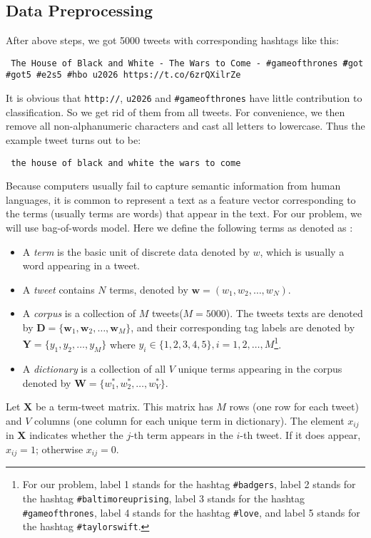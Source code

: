 \documentclass[letterpaper,11pt,twocolumn]{article}
\def\bfw{\mathbf w}
\def\bfW{\mathbf W}
\def\bfD{\mathbf D}
\def\bfY{\mathbf Y}
\def\bfX{\mathbf X}
\begin{document}
\subsection{Data Preprocessing}
After above steps, we got 5000 tweets with corresponding hashtags like this:
\begin{framed}
\texttt{
The House of Black and White - The Wars to Come - \#gameofthrones \textbf\#got \#got5 \#e2s5  \#hbo u2026 https://t.co/6zrQXilrZe
}
\end{framed}
It is obvious that \texttt{http://}, \texttt{u2026} and \texttt{\#gameofthrones} have little contribution to classification. So we get rid of them from all tweets. For convenience, we then remove all non-alphanumeric characters and cast all letters to lowercase. Thus the example tweet turns out to be:
\begin{framed}
\texttt{
the house of black and white the wars to come
}
\end{framed}
Because computers usually fail to capture semantic information from human languages, it is common to represent a text as a feature vector corresponding to the terms (usually terms are words) that appear in the text. For our problem, we will use bag-of-words model. Here we define the following terms as denoted as \cite{blei2003latent}:
\begin{itemize}
\item A \emph{term} is the basic unit of discrete data denoted by $w$, which is usually a word appearing in a tweet.
\item A \emph{tweet} contains $N$ terms, denoted by $\bfw = (w_1, w_2, \dots, w_N)$.
\item A \emph{corpus} is a collection of $M$ tweets($M=5000$). The tweets texts are denoted by $\bfD = \{\bfw_1, \bfw_2, \dots, \bfw_M\}$, and their corresponding tag labels are denoted by $\bfY = \{y_1, y_2, \dots, y_M\}$ where $y_i \in \{1, 2, 3, 4, 5\}, i = 1, 2, \dots, M$\footnote{For our problem, label 1 stands for the hashtag \texttt{\#badgers}, label 2 stands for the hashtag \texttt{\#baltimoreuprising}, label 3 stands for the hashtag \texttt{\#gameofthrones}, label 4 stands for the hashtag \texttt{\#love}, and label 5 stands for the hashtag \texttt{\#taylorswift}.}.
\item A \emph{dictionary} is a collection of all $V$ unique terms appearing in the corpus denoted by $\bfW = \{w_1^*, w_2^*, \dots, w_V^*\}$.
\end{itemize}

Let $\bfX$ be a term-tweet matrix. This matrix has $M$ rows (one row for each tweet) and $V$ columns (one column for each unique term in dictionary). The element $x_{ij}$ in $\bfX$ indicates whether the $j$-th term appears in the $i$-th tweet. If it does appear, $x_{ij} = 1$; otherwise $x_{ij} = 0$.
\end{document}
